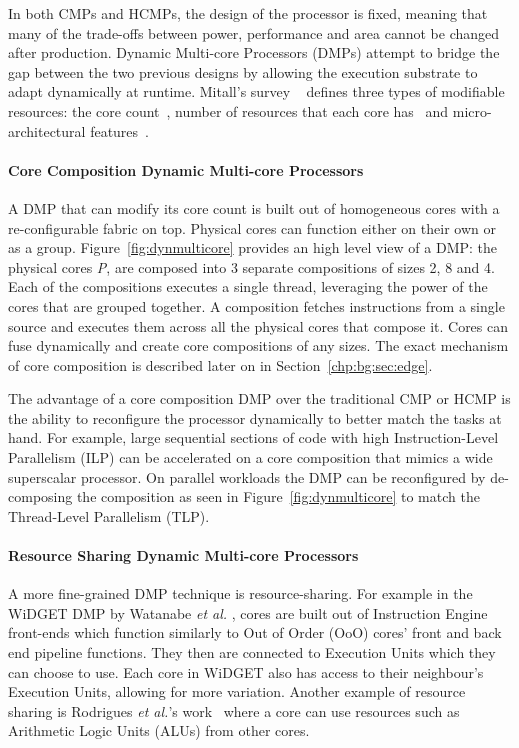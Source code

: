 In both CMPs and HCMPs, the design of the processor is fixed, meaning that many of the trade-offs between power, performance and area cannot be changed after production.
Dynamic Multi-core Processors (DMPs) attempt to bridge the gap between the two previous designs by allowing the execution substrate to adapt dynamically at runtime.
Mitall's survey ~\cite{MittalSurv2016} defines three types of modifiable resources: the core count~\cite{ipek2007CoreFusion,kim2007tflex,pricopi2012bahurupi}, number of resources that each core has~\cite{Homayoun3DPooling2012} and micro-architectural features~\cite{fallinhetblock2014,BauerRSE08,tavanaElastic}.

\paragraph*{Core Composition Dynamic Multi-core Processors}


A DMP that can modify its core count is built out of homogeneous cores with a re-configurable fabric on top.
Physical cores can function either on their own or as a group.
Figure~\ref{fig:dynmulticore} provides an high level view of a DMP: the physical cores \textit{P}, are composed into 3 separate compositions of sizes 2, 8 and 4.
Each of the compositions executes a single thread, leveraging the power of the cores that are grouped together.
A composition fetches instructions from a single source and executes them across all the physical cores that compose it.
Cores can fuse dynamically and create core compositions of any sizes.
The exact mechanism of core composition is described later on in Section~\ref{chp:bg:sec:edge}.

The advantage of a core composition DMP over the traditional CMP or HCMP is the ability to reconfigure the processor dynamically to better match the tasks at hand.
For example, large sequential sections of code with high Instruction-Level Parallelism (ILP) can be accelerated on a core composition that mimics a wide superscalar processor.
On parallel workloads the DMP can be reconfigured by de-composing the composition as seen in Figure~\ref{fig:dynmulticore} to match the Thread-Level Parallelism (TLP).

\paragraph*{Resource Sharing Dynamic Multi-core Processors}
A more fine-grained DMP technique is resource-sharing.
For example in the WiDGET DMP by Watanabe {\it et al.} \cite{Watanabe2010Widget}, cores are built out of Instruction Engine front-ends which function similarly to Out of Order (OoO) cores' front and back end pipeline functions.
They then are connected to Execution Units which they can choose to use.
Each core in WiDGET also has access to their neighbour's Execution Units, allowing for more variation.
Another example of resource sharing is Rodrigues {\it et al.}'s work~\cite{rodrigues2014perf} where a core can use resources such as Arithmetic Logic Units (ALUs) from other cores.

